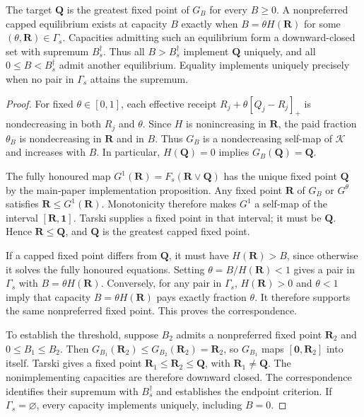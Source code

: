 \begin{proposition}\label{prop:critical-capacity-appendix}
The target $\mathbf{Q}$ is the greatest fixed point of $G_B$ for every $B\geq0$. A nonpreferred capped equilibrium exists at capacity $B$ exactly when $B=\theta H(\mathbf{R})$ for some $(\theta,\mathbf{R})\in\Gamma_s$. Capacities admitting such an equilibrium form a downward-closed set with supremum $B_s^\dagger$. Thus all $B>B_s^\dagger$ implement $\mathbf{Q}$ uniquely, and all $0\leq B<B_s^\dagger$ admit another equilibrium. Equality implements uniquely precisely when no pair in $\Gamma_s$ attains the supremum.
\end{proposition}
\begin{proof}
For fixed $\theta\in[0,1]$, each effective receipt $R_j+\theta[Q_j-R_j]_+$ is nondecreasing in both $R_j$ and $\theta$. Since $H$ is nonincreasing in $\mathbf{R}$, the paid fraction $\theta_B$ is nondecreasing in $\mathbf{R}$ and in $B$. Thus $G_B$ is a nondecreasing self-map of $\mathcal K$ and increases with $B$. In particular, $H(\mathbf{Q})=0$ implies $G_B(\mathbf{Q})=\mathbf{Q}$.

The fully honoured map $G^1(\mathbf{R})=F_s(\mathbf{R}\vee\mathbf{Q})$ has the unique fixed point $\mathbf{Q}$ by the main-paper implementation proposition. Any fixed point $\mathbf{R}$ of $G_B$ or $G^\theta$ satisfies $\mathbf{R}\leq G^1(\mathbf{R})$. Monotonicity therefore makes $G^1$ a self-map of the interval $[\mathbf{R},\mathbf1]$. Tarski supplies a fixed point in that interval; it must be $\mathbf{Q}$. Hence $\mathbf{R}\leq\mathbf{Q}$, and $\mathbf{Q}$ is the greatest capped fixed point.

If a capped fixed point differs from $\mathbf{Q}$, it must have $H(\mathbf{R})>B$, since otherwise it solves the fully honoured equations. Setting $\theta=B/H(\mathbf{R})<1$ gives a pair in $\Gamma_s$ with $B=\theta H(\mathbf{R})$. Conversely, for any pair in $\Gamma_s$, $H(\mathbf{R})>0$ and $\theta<1$ imply that capacity $B=\theta H(\mathbf{R})$ pays exactly fraction $\theta$. It therefore supports the same nonpreferred fixed point. This proves the correspondence.

To establish the threshold, suppose $B_2$ admits a nonpreferred fixed point $\mathbf{R}_2$ and $0\leq B_1\leq B_2$. Then $G_{B_1}(\mathbf{R}_2)\leq G_{B_2}(\mathbf{R}_2)=\mathbf{R}_2$, so $G_{B_1}$ maps $[\mathbf0,\mathbf{R}_2]$ into itself. Tarski gives a fixed point $\mathbf{R}_1\leq\mathbf{R}_2\leq\mathbf{Q}$, with $\mathbf{R}_1\ne\mathbf{Q}$. The nonimplementing capacities are therefore downward closed. The correspondence identifies their supremum with $B_s^\dagger$ and establishes the endpoint criterion. If $\Gamma_s=\varnothing$, every capacity implements uniquely, including $B=0$.
\end{proof}

